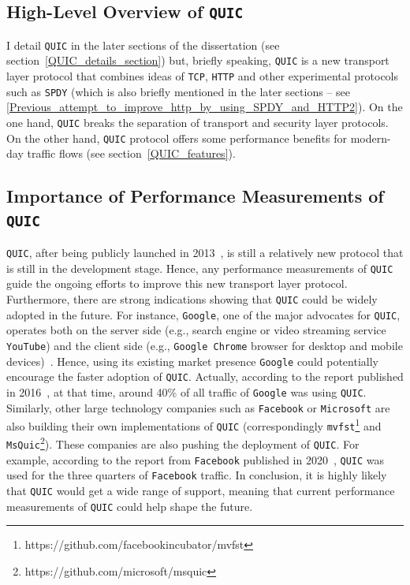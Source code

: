 \documentclass[12pt,a4paper]{report}
\begin{document}
 

\subsection{High-Level Overview of \texttt{QUIC}}
I detail \texttt{QUIC} in the later sections of the dissertation (see section~\ref{QUIC_details_section}) but, briefly speaking, \texttt{QUIC} is a new transport layer protocol that combines ideas of \texttt{TCP}, \texttt{HTTP} and other experimental protocols such as \texttt{SPDY} (which is also briefly mentioned in the later sections -- see \ref{Previous_attempt_to_improve_http_by_using_SPDY_and_HTTP2}).
On the one hand, \texttt{QUIC} breaks the separation of transport and security layer protocols. 
On the other hand, \texttt{QUIC} protocol offers some performance benefits for modern-day traffic flows (see section~\ref{QUIC_features}).


\subsection{Importance of Performance Measurements of \texttt{QUIC}}

\texttt{QUIC}, after being publicly launched in 2013~\cite{Chromium_Blog_Experimenting_with_quic},  is still a relatively new protocol that is still in the development stage.
Hence, any performance measurements of \texttt{QUIC} guide the ongoing efforts to improve this new transport layer protocol.
Furthermore, there are strong indications showing that \texttt{QUIC} could be widely adopted in the future.
For instance, \texttt{Google}, one of the major advocates for \texttt{QUIC}, operates both on the server side (e.g., search engine or video streaming service \texttt{YouTube}) and the client side (e.g., \texttt{Google Chrome} browser for desktop and mobile devices)~\cite{A_QUICk_Introduction_to_HTTP3}.
Hence, using its existing market presence \texttt{Google} could potentially encourage the faster adoption of \texttt{QUIC}.
Actually, according to the report published in 2016~\cite{RuthJan2018AFLa}, at that time, around 40\% of all traffic of \texttt{Google} was using \texttt{QUIC}.
Similarly, other large technology companies such as \texttt{Facebook} or \texttt{Microsoft} are also building their own implementations of \texttt{QUIC} (correspondingly \texttt{mvfst}\footnote{https://github.com/facebookincubator/mvfst} and \texttt{MsQuic}\footnote{https://github.com/microsoft/msquic}).
These companies are also pushing the deployment of \texttt{QUIC}. 
For example, according to the report from \texttt{Facebook} published in 2020~\cite{how-facebook-is-bringing-quic-to-billions}, \texttt{QUIC} was used for the three quarters of \texttt{Facebook} traffic. 
In conclusion, it is highly likely that \texttt{QUIC} would get a wide range of support, meaning that current performance measurements of \texttt{QUIC} could help shape the future.
\end{document}
